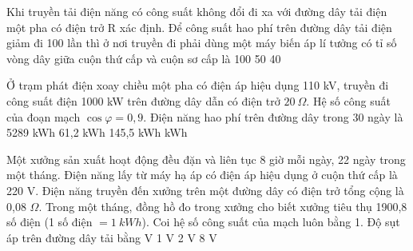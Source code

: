 \begin{vidu} %
	Khi truyền tải điện năng có công suất không đổi đi xa với đường dây tải điện một pha có điện trở R xác định. Để công suất hao phí trên đường dây tải điện giảm đi 100 lần thì ở nơi truyền đi phải dùng một máy biến áp lí tưởng có tỉ số vòng dây giữa cuộn thứ cấp và cuộn sơ cấp là
	\choice
	{100}
	{}
	{50}
	{40}
\end{vidu}
\begin{vidu} %
	Ở trạm phát điện xoay chiều một pha có điện áp hiệu dụng 110 kV, truyền đi công suất điện 1000 kW trên đường dây dẫn có điện trở $20\ \Omega$. Hệ số công suất của đoạn mạch $\cos \varphi =0,9$. Điện năng hao phí trên đường dây trong 30 ngày là
	\choice
	{5289 kWh}
	{61,2 kWh}
	{145,5 kWh}
	{ kWh}
\end{vidu}
\begin{vidu} %
	Một xưởng sản xuất hoạt động đều đặn và liên tục 8 giờ mỗi ngày, 22 ngày trong một tháng. Điện năng lấy từ máy hạ áp có điện áp hiệu dụng ở cuộn thứ cấp là 220 V. Điện năng truyền đến xưởng trên một đường dây có điện trở tổng cộng là 0,08 $\Omega$. Trong một tháng, đồng hồ đo trong xưởng cho biết xưởng tiêu thụ 1900,8 số điện (1 số điện $= 1\ kWh$). Coi hệ số công suất của mạch luôn bằng 1. Độ sụt áp trên đường dây tải bằng
	\choice
	{ V}
	{1 V}
	{2 V}
	{8 V}
\end{vidu}
